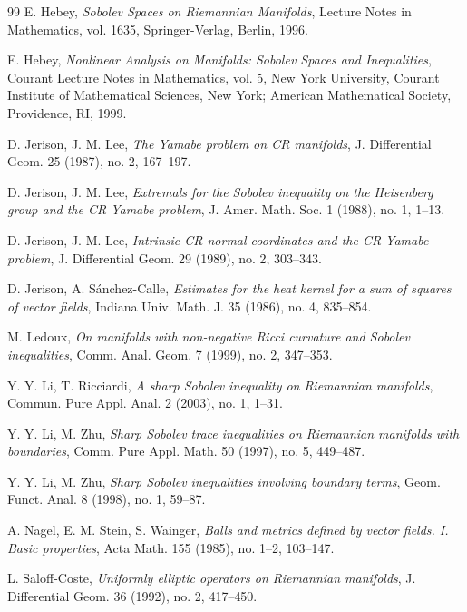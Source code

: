 \documentclass[11pt]{article}
\numberwithin{equation}{section}
\newcounter{problem}
\numberwithin{equation}{section}
\begin{document}
\begin{thebibliography}{99}
		E. Hebey, 
		\emph{Sobolev Spaces on Riemannian Manifolds},
		Lecture Notes in Mathematics, vol. 1635,
		Springer-Verlag, Berlin, 1996.
		
		E. Hebey, 
		\emph{Nonlinear Analysis on Manifolds: Sobolev Spaces and Inequalities},
		Courant Lecture Notes in Mathematics, vol. 5,
		New York University, Courant Institute of Mathematical Sciences, New York;
		American Mathematical Society, Providence, RI, 1999.
		
		D. Jerison, J. M. Lee,  
		\emph{The Yamabe problem on CR manifolds},
		J. Differential Geom. 25 (1987), no. 2, 167--197.
		
		D. Jerison, J. M. Lee, 
		\emph{Extremals for the Sobolev inequality on the Heisenberg group and the CR Yamabe problem}, J. Amer. Math. Soc. 1 (1988), no. 1, 1--13.
		
		D. Jerison, J. M. Lee, 
		\emph{Intrinsic CR normal coordinates and the CR Yamabe problem}, J. Differential Geom. 29 (1989), no. 2, 303--343.
		
		D. Jerison, A. S\'anchez-Calle, 
		\emph{Estimates for the heat kernel for a sum of squares of vector fields},
		Indiana Univ. Math. J. 35 (1986), no. 4, 835--854.  
		
		M. Ledoux, 
		\emph{On manifolds with non-negative Ricci curvature and Sobolev inequalities},
		Comm. Anal. Geom. 7 (1999), no. 2, 347--353.
		
		Y. Y. Li, T. Ricciardi, 
		\emph{A sharp Sobolev inequality on Riemannian manifolds},
		Commun. Pure Appl. Anal. 2 (2003), no. 1, 1--31.
		
		Y. Y. Li, M. Zhu, 
		\emph{Sharp Sobolev trace inequalities on Riemannian manifolds with boundaries},
		Comm. Pure Appl. Math. 50 (1997), no. 5, 449--487.
		
		Y. Y. Li, M. Zhu, 
		\emph{Sharp Sobolev inequalities involving boundary terms},
		Geom. Funct. Anal. 8 (1998), no. 1, 59--87.
		
		A. Nagel, E. M. Stein, S. Wainger, 
		\emph{Balls and metrics defined by vector fields. I. Basic properties},
		Acta Math. 155 (1985), no. 1--2, 103--147.
		
		L. Saloff-Coste, 
		\emph{Uniformly elliptic operators on Riemannian manifolds},
		J. Differential Geom. 36 (1992), no. 2, 417--450.
		

\end{thebibliography}
\end{document}

